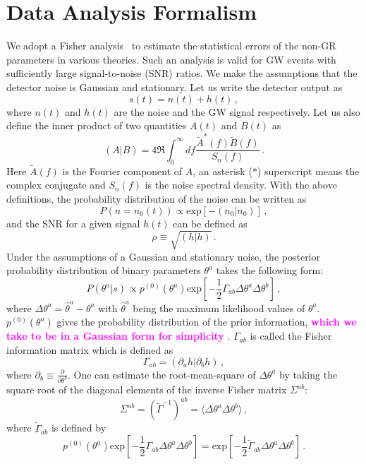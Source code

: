\documentclass[prd,twocolumn,nofootinbib]{revtex4-1}
\newcommand\be{\begin{equation}}
\newcommand\ee{\end{equation}}
\newcommand{\kent}[1]{\textcolor{magenta}{\textbf{#1}} }
\begin{document}
\section{Data Analysis Formalism}
We adopt a Fisher analysis~\cite{Cutler:1994ys} to estimate the statistical errors of the non-GR parameters in various theories. Such an analysis is valid for GW events with sufficiently large signal-to-noise (SNR) ratios. We make the assumptions that the detector noise is Gaussian and stationary. Let us write the detector output as
\be
s(t)=n(t)+h(t)\,,
\ee
where $n(t)$ and $h(t)$ are the noise and the GW signal respectively. Let us also define the inner product of two quantities $A(t)$ and $B(t)$ as
 \be
 \left(A|B\right)=4\Re\int_0^\infty df \frac{\tilde{A}^*(f)\tilde{B}(f)}{S_n \left( f \right)}\,.
 \ee
Here $\tilde{A}(f)$ is the Fourier component of $A$, an asterisk ($*$) superscript means the complex conjugate and $S_n\left(f\right)$ is the noise spectral density. With the above definitions, the probability distribution of the noise can be written as
 \be
P\left(n=n_0(t)\right) \propto \text{exp}\left[-\left(n_0|n_0\right)\right]\,,
\ee
and the SNR for a given signal $h(t)$ can be defined as
\be
\rho \equiv\sqrt{\left(h|h\right)}\,.
\ee
Under the assumptions of a Gaussian and stationary noise, the posterior probability distribution of binary parameters $\theta^a$ takes the following form:
\be
P\left(\theta^a|s\right) \propto p^{(0)}\left(\theta^a\right) \text{exp}\left[-\frac{1}{2} \Gamma_{ab} \Delta\theta^a\Delta \theta^b \right]\,,
\ee
where $\Delta \theta^a=\hat{\theta}^a-\theta^a$ with $\hat{\theta}^a$ being the maximum likelihood values of $\theta^a$. $p^{(0)}\left(\theta^a\right)$ gives the probability distribution of the prior information, \kent{which we take to be in a Gaussian form for simplicity}. $\Gamma_{ab}$ is called the Fisher information matrix which is defined as
\be
\Gamma_{ab}=\left(\partial_a h|\partial_b h \right)\,,
\ee
where $\partial_b\equiv \frac{\partial}{\partial \theta^b}$. One can estimate the root-mean-square of $\Delta \theta^a$ by taking the square root of the diagonal elements of the inverse Fisher matrix $\Sigma^{ab}$: 
\be
\Sigma^{ab}=\left(\tilde{\Gamma}^{-1}\right)^{ab}=\langle\Delta\theta^a\Delta \theta^b\rangle\,,
\ee
where $\tilde{\Gamma}_{ab}$ is defined by
\be
p^{(0)}\left(\theta^a\right) \text{exp}\left[-\frac{1}{2} \Gamma_{ab} \Delta\theta^a\Delta \theta^b \right]=\text{exp}\left[-\frac{1}{2} \tilde{\Gamma}_{ab} \Delta\theta^a\Delta \theta^b \right]\,.
\ee
\end{document}
